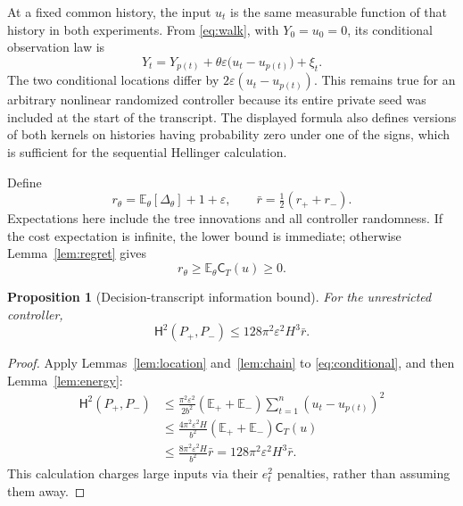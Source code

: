 \documentclass[11pt]{article}
\newtheorem{proposition}[theorem]{Proposition}
\theoremstyle{remark}
\newcommand{\E}{\mathbb E}
\newcommand{\cost}{\mathsf C}
\newcommand{\HH}{\mathsf H}
\begin{document}
At a fixed common history, the input $u_t$ is the same measurable function of that history in both experiments. From \eqref{eq:walk}, with $Y_0=u_0=0$, its conditional observation law is
\begin{equation}\label{eq:conditional}
 Y_t=Y_{p(t)}+\theta\varepsilon\bigl(u_t-u_{p(t)}\bigr)+\xi_t.
\end{equation}
The two conditional locations differ by $2\varepsilon(u_t-u_{p(t)})$. This remains true for an arbitrary nonlinear randomized controller because its entire private seed was included at the start of the transcript. The displayed formula also defines versions of both kernels on histories having probability zero under one of the signs, which is sufficient for the sequential Hellinger calculation.

Define
\begin{equation}\label{eq:rdef}
 r_\theta=\E_\theta[\Delta_\theta]+1+\varepsilon,
 \qquad \bar r=\tfrac12(r_++r_-).
\end{equation}
Expectations here include the tree innovations and all controller randomness. If the cost expectation is infinite, the lower bound is immediate; otherwise Lemma~\ref{lem:regret} gives
\begin{equation}\label{eq:rcontrols}
 r_\theta\ge\E_\theta\cost_T(u)\ge0.
\end{equation}

\begin{proposition}[Decision-transcript information bound]\label{prop:info}
For the unrestricted controller,
\begin{equation}\label{eq:information}
 \HH^2(P_+,P_-)
 \le128\pi^2\varepsilon^2H^3\bar r.
\end{equation}
\end{proposition}
\begin{proof}
Apply Lemmas~\ref{lem:location} and~\ref{lem:chain} to \eqref{eq:conditional}, and then Lemma~\ref{lem:energy}:
\begin{align*}
 \HH^2(P_+,P_-)
 &\le\frac{\pi^2\varepsilon^2}{2b^2}
 \left(\E_++\E_-\right)\sum_{t=1}^n(u_t-u_{p(t)})^2\\
 &\le\frac{4\pi^2\varepsilon^2H}{b^2}
 \left(\E_++\E_-\right)\cost_T(u)\\
 &\le\frac{8\pi^2\varepsilon^2H}{b^2}\bar r
 =128\pi^2\varepsilon^2H^3\bar r.
\end{align*}
This calculation charges large inputs via their $e_t^2$ penalties, rather than assuming them away.
\end{proof}
\end{document}
